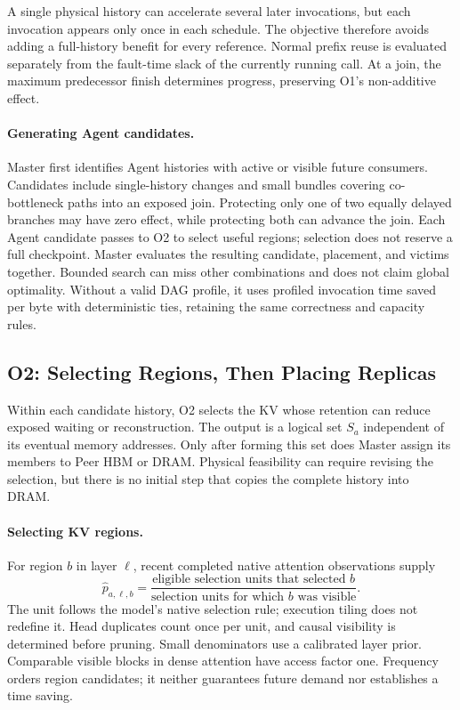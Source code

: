 A single physical history can accelerate several later invocations,
but each invocation appears only once in each schedule. The objective
therefore avoids adding a full-history benefit for every reference.
Normal prefix reuse is evaluated separately from the fault-time slack
of the currently running call. At a join, the maximum predecessor
finish determines progress, preserving O1's non-additive effect.

\paragraph{Generating Agent candidates.}
Master first identifies Agent histories with active or visible future
consumers. Candidates include single-history changes and small bundles
covering co-bottleneck paths into an exposed join. Protecting only one
of two equally delayed branches may have zero effect, while protecting
both can advance the join. Each Agent candidate passes to O2 to
select useful regions; selection does not reserve a full checkpoint.
Master evaluates the resulting candidate, placement, and victims
together. Bounded search can miss other combinations and does not claim
global optimality. Without a valid DAG profile, it uses profiled
invocation time saved per byte with deterministic ties, retaining the
same correctness and capacity rules.

\subsection{O2: Selecting Regions, Then Placing Replicas}
\label{sec:teacher-region-selection}

Within each candidate history, O2 selects the KV whose retention can
reduce exposed waiting or reconstruction. The output is a logical set
$S_a$ independent of its eventual memory addresses. Only after forming
this set does Master assign its members to Peer HBM or DRAM. Physical
feasibility can require revising the selection, but there is no initial
step that copies the complete history into DRAM.

\paragraph{Selecting KV regions.}
For region $b$ in layer $\ell$, recent completed native attention
observations supply
\begin{equation}
 \widehat p_{a,\ell,b}=
 \frac{\text{eligible selection units that selected }b}
      {\text{selection units for which }b\text{ was visible}}.
 \label{eq:teacher-demand}
\end{equation}
The unit follows the model's native selection rule; execution tiling
does not redefine it. Head duplicates count once per unit, and causal
visibility is determined before pruning. Small denominators use a
calibrated layer prior. Comparable visible blocks in dense attention
have access factor one. Frequency orders region candidates; it neither
guarantees future demand nor establishes a time saving.

